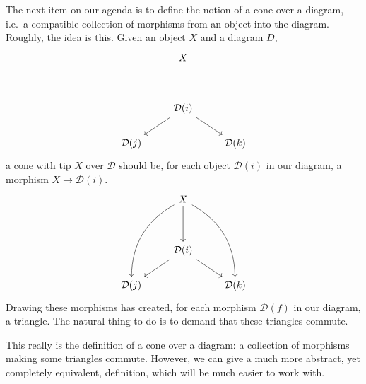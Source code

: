 \documentclass[main.tex]{subfiles}
\begin{document}
The next item on our agenda is to define the notion of a cone over a diagram, i.e.\ a compatible collection of morphisms from an object into the diagram. Roughly, the idea is this. Given an object $X$ and a diagram $D$,
\begin{equation*}
  \begin{tikzcd}
    & X
    \\
    \\
    & \mathcal{D}(i)
    \arrow[dr]
    \arrow[dl]
    \\
    \mathcal{D}(j)
    && \mathcal{D}(k)
  \end{tikzcd}
\end{equation*}
a cone with tip $X$ over $\mathcal{D}$ should be, for each object $\mathcal{D}(i)$ in our diagram, a morphism $X \to \mathcal{D}(i)$.
\begin{equation*}
  \begin{tikzcd}
    & X
    \arrow[dddl, bend right]
    \arrow[dddr, bend left]
    \arrow[dd]
    \\
    \\
    & \mathcal{D}(i)
    \arrow[dr]
    \arrow[dl]
    \\
    \mathcal{D}(j)
    && \mathcal{D}(k)
  \end{tikzcd}
\end{equation*}
Drawing these morphisms has created, for each morphism $\mathcal{D}(f)$ in our diagram, a triangle. The natural thing to do is to demand that these triangles commute.

This really is the definition of a cone over a diagram: a collection of morphisms making some triangles commute. However, we can give a much more abstract, yet completely equivalent, definition, which will be much easier to work with.
\end{document}
